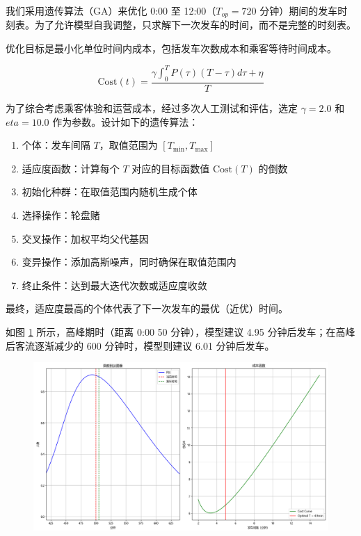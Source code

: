 
我们采用遗传算法（GA）\cite{HollandGA}来优化 0:00 至 12:00（$T_{op}=720$ 分钟）期间的发车时刻表。为了允许模型自我调整，只求解下一次发车的时间，而不是完整的时刻表。\cite{GoldbergGA}

优化目标是最小化单位时间内成本，包括发车次数成本和乘客等待时间成本。

$$
\text{Cost}(t) = \frac{\gamma \int _0 ^T P(\tau)(T-\tau)d\tau + \eta}{T}
$$

为了综合考虑乘客体验和运营成本，经过多次人工测试和评估，选定 $\gamma=2.0$ 和 $eta=10.0$ 作为参数。设计如下的遗传算法：

\begin{enumerate}
    \item 个体：发车间隔 $T$，取值范围为 $[T_{\min}, T_{\max}]$
    \item 适应度函数：计算每个 $T$ 对应的目标函数值 $\text{Cost}(T)$ 的倒数
    \item 初始化种群：在取值范围内随机生成个体
    \item 选择操作：轮盘赌
    \item 交叉操作：加权平均父代基因
    \item 变异操作：添加高斯噪声，同时确保在取值范围内
    \item 终止条件：达到最大迭代次数或适应度收敛
\end{enumerate}

最终，适应度最高的个体代表了下一次发车的最优（近优）时间。

如图 \ref{fig:gaBuji1} 所示，高峰期时（距离 0:00 50 分钟），模型建议 4.95 分钟后发车；在高峰后客流逐渐减少的 600 分钟时，模型则建议 6.01 分钟后发车。

\begin{figure}[htbp]
    \centering
    \includegraphics[width=1.0\textwidth]{res/Figure_7.png}
    \label{fig:gaBuji1}
\end{figure}

